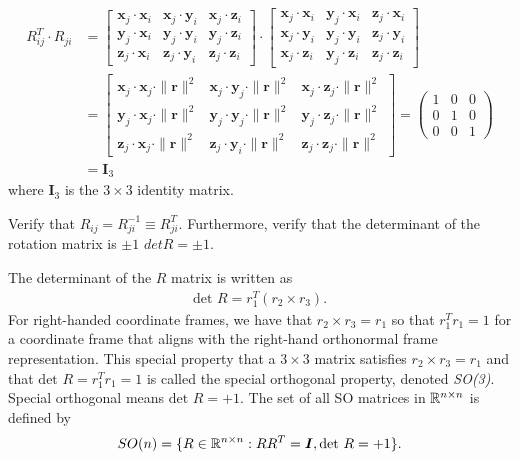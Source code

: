 \begin{align}
R_{ij}^T \cdot R_{ji} & = 
\begin{bmatrix}
\bm{x}_j \cdot \bm{x}_i & \bm{x}_j \cdot \bm{y}_i  & \bm{x}_j \cdot \bm{z}_i \\
%
\bm{y}_j \cdot \bm{x}_i & \bm{y}_j \cdot \bm{y}_i & \bm{y}_j \cdot \bm{z}_i \\
%
\bm{z}_j \cdot \bm{x}_i & \bm{z}_j \cdot \bm{y}_i  & \bm{z}_j \cdot \bm{z}_i 
\end{bmatrix}
\cdot 
\begin{bmatrix}
\bm{x}_j \cdot \bm{x}_i & \bm{y}_j \cdot \bm{x}_i & \bm{z}_j \cdot \bm{x}_i \\
%
\bm{x}_j \cdot \bm{y}_i & \bm{y}_j \cdot \bm{y}_i & \bm{z}_j \cdot \bm{y}_i \\
%
\bm{x}_j \cdot \bm{z}_i & \bm{y}_j \cdot \bm{z}_i & \bm{z}_j \cdot \bm{z}_i 
\end{bmatrix} \\
%
& = 
\begin{bmatrix}
\bm{x}_j \cdot \bm{x}_j \cdot \|\bm{r}\|^2 & \bm{x}_j \cdot \bm{y}_j \cdot \|\bm{r}\|^2 & \bm{x}_j \cdot \bm{z}_j  \cdot \|\bm{r}\|^2  \\
%
\bm{y}_j \cdot \bm{x}_j  \cdot \|\bm{r}\|^2  & \bm{y}_j \cdot \bm{y}_j  \cdot \|\bm{r}\|^2  & \bm{y}_j \cdot \bm{z}_j  \cdot \|\bm{r}\|^2  \\
%
\bm{z}_j \cdot \bm{x}_j  \cdot \|\bm{r}\|^2  & \bm{z}_j \cdot \bm{y}_i  \cdot \|\bm{r}\|^2  & \bm{z}_j \cdot \bm{z}_j  \cdot \|\bm{r}\|^2  
\end{bmatrix}
%
= 
\left(\begin{array}{ccc}
1 & 0 & 0 \\
%
0 & 1 & 0  \\
%
0 & 0 & 1 
\end{array}\right) \\
%
& = \bm{I}_3
\end{align}
%
where $\bm{I}_3$ is the $3 \times 3$ identity matrix.
%

\noindent 
\begin{homework}
	Verify that $R_{ij} = R_{ji}^{-1} \equiv R_{ji}^T$. Furthermore, verify that the determinant of the rotation matrix is $\pm1$ \ie $det R = \pm1$.
\end{homework}

The determinant of the $R$ matrix is written as 
%
\begin{align}
\text{det }  R = r_1^T \left(r_2 \times r_3\right).
\end{align}
%
For right-handed coordinate frames, we have that $r_2 \times r_3 = r_1$ so that $r_1^Tr_1 = 1$ for a coordinate frame that aligns with the right-hand orthonormal frame representation. This special property that a $3 \times 3$ matrix satisfies $r_2 \times r_3 = r_1$ and that $\text{det }  R = r_1^Tr_1 = 1$ is called the special orthogonal property, denoted \textit{SO(3)}. Special orthogonal means $\text{det } R = + 1$. The set of all SO matrices in $\mathbb{R}^{n\times n}$ is defined by 
%
\begin{align}
SO(n) = \{R\in \mathbb{R}^{n\times n}: RR^T = \bm{I}, \text{det } R = + 1\}.
\end{align}

